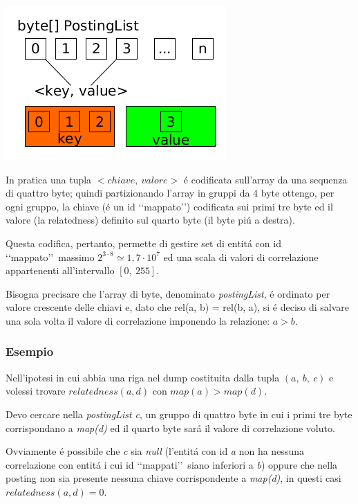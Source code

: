 \begin{center}
    \includegraphics[scale=0.55]{Sources/Img/c02_01.png}
\end{center}

In pratica una tupla $<chiave,\ valore>$ \'e codificata sull'array da una sequenza di quattro byte; quindi partizionando l'array in gruppi da 4 byte 
ottengo, per ogni gruppo, la chiave (\'e un id \lq\lq mappato\rq\rq ) codificata sui primi tre byte ed il valore (la relatedness) definito sul quarto byte (il byte pi\'u a destra).

Questa codifica, pertanto, permette di gestire set di entit\'a con id \lq\lq mappato\rq\rq\ massimo $2^{3 \cdot 8} \simeq 1,7 \cdot 10^7$ ed una scala di valori 
di correlazione appartenenti all'intervallo $[0,\ 255]$.

Bisogna precisare che l'array di byte, denominato \textit{postingList}, \'e ordinato per valore crescente delle chiavi e, dato che rel(a, b) = rel(b, a),
si \'e deciso di salvare una sola volta il valore di correlazione imponendo la relazione: $a > b$.

\subsubsection{Esempio}
Nell'ipotesi in cui abbia una riga nel dump costituita dalla tupla $(a,\ b,\ c)$ e volessi trovare $relatedness(a, d)$ con $map(a) > map(d)$. 

Devo cercare nella \textit{postingList c}, un gruppo di quattro byte in cui i primi tre byte corrispondano a \textit{map(d)} ed il quarto byte sar\'a il valore di correlazione voluto. 

Ovviamente \'e possibile che \textit{c} sia \textit{null} (l'entit\'a con id \textit{a} non ha nessuna correlazione con entit\'a i cui id \lq\lq mappati\rq\rq\ siano inferiori a \textit{b}) oppure 
che nella posting non sia presente nessuna chiave corrispondente a \textit{map(d)}, in questi casi $relatedness(a,d) = 0$. 


